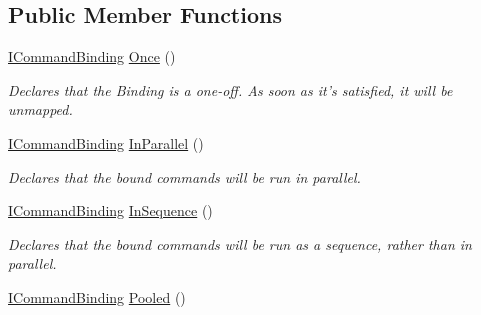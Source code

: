\subsection*{Public Member Functions}
\begin{DoxyCompactItemize}
\item 
\hypertarget{interfacestrange_1_1extensions_1_1command_1_1api_1_1_i_command_binding_a83a6c902c38775b55ba74e75807cd603}{\hyperlink{interfacestrange_1_1extensions_1_1command_1_1api_1_1_i_command_binding}{I\-Command\-Binding} \hyperlink{interfacestrange_1_1extensions_1_1command_1_1api_1_1_i_command_binding_a83a6c902c38775b55ba74e75807cd603}{Once} ()}\label{interfacestrange_1_1extensions_1_1command_1_1api_1_1_i_command_binding_a83a6c902c38775b55ba74e75807cd603}

\begin{DoxyCompactList}\small\item\em Declares that the Binding is a one-\/off. As soon as it's satisfied, it will be unmapped. \end{DoxyCompactList}\item 
\hyperlink{interfacestrange_1_1extensions_1_1command_1_1api_1_1_i_command_binding}{I\-Command\-Binding} \hyperlink{interfacestrange_1_1extensions_1_1command_1_1api_1_1_i_command_binding_acbaef737b3351ad56d071e214061af1d}{In\-Parallel} ()
\begin{DoxyCompactList}\small\item\em Declares that the bound commands will be run in parallel. \end{DoxyCompactList}\item 
\hypertarget{interfacestrange_1_1extensions_1_1command_1_1api_1_1_i_command_binding_a6cebcf5a61c1b6a8b3c90207be458c58}{\hyperlink{interfacestrange_1_1extensions_1_1command_1_1api_1_1_i_command_binding}{I\-Command\-Binding} \hyperlink{interfacestrange_1_1extensions_1_1command_1_1api_1_1_i_command_binding_a6cebcf5a61c1b6a8b3c90207be458c58}{In\-Sequence} ()}\label{interfacestrange_1_1extensions_1_1command_1_1api_1_1_i_command_binding_a6cebcf5a61c1b6a8b3c90207be458c58}

\begin{DoxyCompactList}\small\item\em Declares that the bound commands will be run as a sequence, rather than in parallel. \end{DoxyCompactList}\item 
\hypertarget{interfacestrange_1_1extensions_1_1command_1_1api_1_1_i_command_binding_a34d08b3730d94b7ea0f0c18a7745ada5}{\hyperlink{interfacestrange_1_1extensions_1_1command_1_1api_1_1_i_command_binding}{I\-Command\-Binding} \hyperlink{interfacestrange_1_1extensions_1_1command_1_1api_1_1_i_command_binding_a34d08b3730d94b7ea0f0c18a7745ada5}{Pooled} ()}\label{interfacestrange_1_1extensions_1_1command_1_1api_1_1_i_command_binding_a34d08b3730d94b7ea0f0c18a7745ada5}


\end{DoxyCompactItemize}
